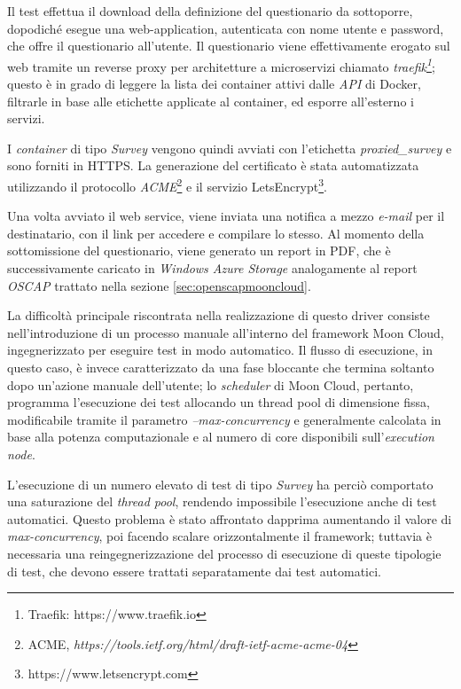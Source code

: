 \documentclass[../main.tex]{subfiles}
\begin{document}
Il test effettua il download della definizione del questionario da sottoporre, dopodiché esegue una web-application, autenticata con nome utente e password, che offre il questionario all'utente.
Il questionario viene effettivamente erogato sul web tramite un reverse proxy per architetture a microservizi chiamato \textit{traefik\footnote{Traefik: https://www.traefik.io}}; questo è in grado di leggere la lista dei container attivi dalle \textit{API} di Docker, filtrarle in base alle etichette applicate al container, ed esporre all'esterno i servizi.

I \textit{container} di tipo \textit{Survey} vengono quindi  avviati con l'etichetta \textit{proxied\_survey} e sono forniti in HTTPS.
La generazione del certificato è stata automatizzata utilizzando il protocollo \textit{ACME}\footnote{ACME,  \textit{https://tools.ietf.org/html/draft-ietf-acme-acme-04}} e il servizio LetsEncrypt\footnote{https://www.letsencrypt.com}.

Una volta avviato il web service, viene inviata una notifica a mezzo \textit{e-mail} per il destinatario, con il link per accedere e compilare lo stesso.
Al momento della sottomissione del questionario, viene generato un report in PDF, che è successivamente caricato in \textit{Windows Azure Storage} analogamente al report \textit{OSCAP} trattato nella sezione \ref{sec:openscapmooncloud}.

La difficoltà principale riscontrata nella realizzazione di questo driver consiste nell'introduzione di un processo manuale all'interno del framework Moon Cloud, ingegnerizzato per eseguire test in modo automatico.
Il flusso di esecuzione, in questo caso, è invece caratterizzato da una fase bloccante che termina soltanto dopo un'azione manuale dell'utente; lo \textit{scheduler} di Moon Cloud, pertanto, programma l'esecuzione dei test allocando un thread pool di dimensione fissa, modificabile tramite il parametro \textit{--max-concurrency} e generalmente calcolata in base alla potenza computazionale e al numero di core disponibili sull'\textit{execution node}.

L'esecuzione di un numero elevato di test di tipo \textit{Survey} ha perciò comportato una saturazione del \textit{thread pool}, rendendo impossibile l'esecuzione anche di test automatici.
Questo problema è stato affrontato dapprima aumentando il valore di \textit{max-concurrency}, poi facendo scalare orizzontalmente il framework; tuttavia è necessaria una reingegnerizzazione del processo di esecuzione di queste tipologie di test, che devono essere trattati separatamente dai test automatici.
\end{document}
